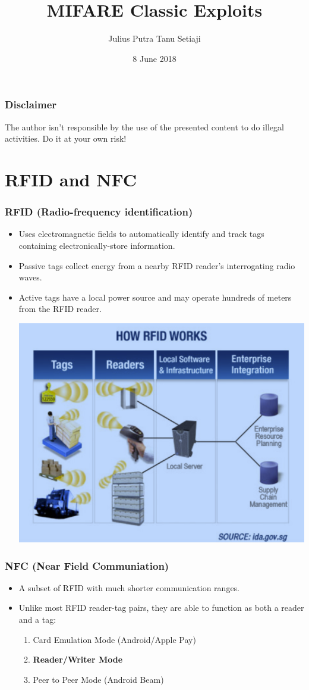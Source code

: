 \documentclass[12pt]{beamer}
\title{MIFARE Classic Exploits}
\author{Julius Putra Tanu Setiaji}
\date{8 June 2018}
\begin{document}
	\frame{\titlepage}

\begin{frame}
\frametitle{Disclaimer}
The author isn't responsible by the use of the presented content to do illegal activities. Do it at your own risk! 
\end{frame}
	
\section{RFID and NFC}

\begin{frame}
\frametitle{RFID (Radio-frequency identification)}
\begin{itemize}
	\item Uses electromagnetic fields to automatically identify and track tags containing electronically-store information.
	\item Passive tags collect energy from a nearby RFID reader's interrogating radio waves.
	\item Active tags have a local power source and may operate hundreds of meters from the RFID reader.
	\begin{center}
		\includegraphics[width=0.5\linewidth]{rfid}
	\end{center}
\end{itemize}
\end{frame}

\begin{frame}
\frametitle{NFC (Near Field Communiation)}
\begin{itemize}
	\item A subset of RFID with much shorter communication ranges.
	\item Unlike most RFID reader-tag pairs, they are able to function as both a reader and a tag:
	\begin{enumerate}
		\item Card Emulation Mode (Android/Apple Pay)
		\item \textbf{Reader/Writer Mode}
		\item Peer to Peer Mode (Android Beam)
	\end{enumerate}
\end{itemize}
\end{frame}
\end{document}
